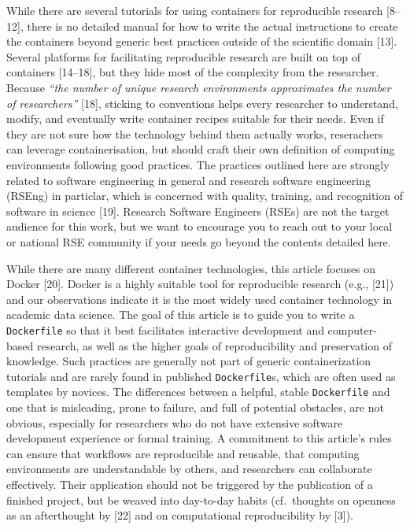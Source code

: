 \documentclass[10pt,letterpaper]{article}
\begin{document}
While there are several tutorials for using containers for reproducible
research {[}8--12{]}, there is no detailed manual for how to write the
actual instructions to create the containers beyond generic best
practices outside of the scientific domain {[}13{]}. Several platforms
for facilitating reproducible research are built on top of containers
{[}14--18{]}, but they hide most of the complexity from the researcher.
Because \emph{``the number of unique research environments approximates
the number of researchers''} {[}18{]}, sticking to conventions helps
every researcher to understand, modify, and eventually write container
recipes suitable for their needs. Even if they are not sure how the
technology behind them actually works, reserachers can leverage
containerisation, but should craft their own definition of computing
environments following good practices. The practices outlined here are
strongly related to software engineering in general and research
software engineering (RSEng) in particlar, which is concerned with
quality, training, and recognition of software in science {[}19{]}.
Research Software Engineers (RSEs) are not the target audience for this
work, but we want to encourage you to reach out to your local or
national RSE community if your needs go beyond the contents detailed
here.

While there are many different container technologies, this article
focuses on Docker {[}20{]}. Docker is a highly suitable tool for
reproducible research (e.g., {[}21{]}) and our observations indicate it
is the most widely used container technology in academic data science.
The goal of this article is to guide you to write a \texttt{Dockerfile}
so that it best facilitates interactive development and computer-based
research, as well as the higher goals of reproducibility and
preservation of knowledge. Such practices are generally not part of
generic containerization tutorials and are rarely found in published
\texttt{Dockerfile}s, which are often used as templates by novices. The
differences between a helpful, stable \texttt{Dockerfile} and one that
is misleading, prone to failure, and full of potential obstacles, are
not obvious, especially for researchers who do not have extensive
software development experience or formal training. A commitment to this
article's rules can ensure that workflows are reproducible and reusable,
that computing environments are understandable by others, and
researchers can collaborate effectively. Their application should not be
triggered by the publication of a finished project, but be weaved into
day-to-day habits (cf.~thoughts on openness as an afterthought by
{[}22{]} and on computational reproducibility by {[}3{]}).
\end{document}

